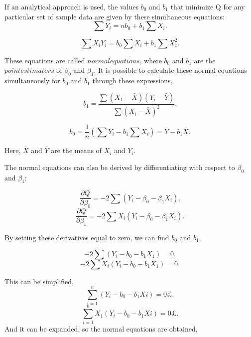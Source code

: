\noindent If an analytical approach is used, the values $b_0$ and $b_1$ that minimize Q for any particular set of sample data are given by these simultaneous equations: 
\begin{equation}
\sum Y_i =n b_0 +b_1 \sum X_i .
\end{equation}

\begin{equation}
\sum X_i Y_i = b_0 \sum X_i + b_1 \sum X_1^2 .
\end{equation}

\noindent These equations are called $normal equations$, where $b_0$ and $b_1$ are the $point estimators$ of $\beta_0$ and $\beta_1$. It is possible to calculate these normal equations simultaneously for $b_0$ and $b_1$ through these expressions,

\begin{equation}
b_1 = \frac{\sum (X_1 - \bar{X}) (Y_i - \bar{Y})}{\sum (X_i - \bar{X})^2} .
\end{equation}

\begin{equation}
	b_0 = \frac{1}{n} (\sum Y_i - b_1 \sum X_i ) = \bar{Y} - b_1 \bar{X} .
\end{equation}

\noindent Here, $\bar{X}$ and $\bar{Y}$ are the means of $X_i$ and $Y_i$.

\noindent The normal equations can also be derived by differentiating with respect to $\beta_0$ and $\beta_1$:

\begin{equation}
	\frac{\partial Q}{\partial \beta_0}=-2 \sum (Y_i - \beta_0 - \beta_1 X_i) .
\end{equation}
\begin{equation}
\frac{\partial Q} {\partial \beta_1} = -2 \sum X_i (Y_i - \beta_0 - \beta_1 X_i) .
\end{equation}

\noindent By setting these derivatives equal to zero, we can find $b_0$ and $b_1$, 

\begin{equation}
	-2 \sum (Y_i - b_0 - b_1 X_1)=0 .
\end{equation}
\begin{equation}
	-2\sum X_i(Y_i - b_0 - b_1 X_1)=0 .
\end{equation}

\noindent This can be simplified, 
\begin{equation}
\sum_{i=1}^{n} (Y_i - b_0 - b_1 Xi)=0£ .
\end{equation}
\begin{equation}
	\sum_{i=1}^{n} X_1(Y_i - b_0 - b_1 Xi)=0£ .
\end{equation}
And it can be expanded, so the normal equations are obtained, 

